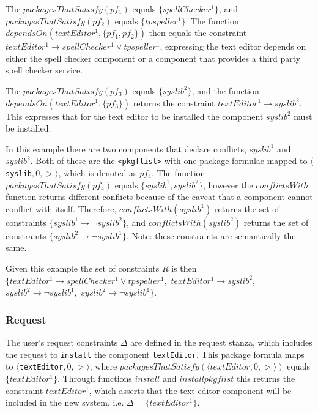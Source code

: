 The $packagesThatSatisfy(pf_1)$ equals $\{spellChecker^1\}$, and $packagesThatSatisfy(pf_2)$ equals $\{tpspeller^1\}$.
The function $dependsOn(textEditor^1 , \{pf_1,pf_2\} )$ 
then equals the constraint $textEditor^1 \rightarrow spellChecker^1 \vee tpspeller^1$,
expressing the text editor depends on either the spell checker component or a component that provides a third party spell checker service.

The $packagesThatSatisfy(pf_3)$ equals $\{syslib^2\}$,
and the function  $dependsOn(textEditor^1 , \{pf_3\} )$ returns the constraint  $textEditor^1 \rightarrow syslib^2$.
This expresses that for the text editor to be installed the component $syslib^2$ must be installed.

In this example there are two components that declare conflicts, $syslib^1$ and $syslib^2$.
Both of these are the \verb+<pkgflist>+ with one package formulae mapped to  $\langle $\verb+syslib+$,0,>\rangle$, which is denoted as $pf_4$.
The function $packagesThatSatisfy(pf_4)$ equals $\{ syslib^1,syslib^2 \}$,
however the $conflictsWith$ function returns different conflicts because of the caveat that a component cannot conflict with itself.
Therefore, $conflictsWith(syslib^1)$ returns the set of constraints $\{syslib^1 \rightarrow \neg syslib^2\}$,
and $conflictsWith(syslib^2)$ returns the set of constraints $\{syslib^2 \rightarrow \neg syslib^1\}$.
Note: these constraints are semantically the same.

Given this example the set of constraints $R$ is then 
$\{ textEditor^1 \rightarrow spellChecker^1 \vee tpspeller^1,$ 
$textEditor^1 \rightarrow syslib^2,$ 
$syslib^2 \rightarrow \neg syslib^1,$   
$syslib^2 \rightarrow \neg syslib^1\}$.

\subsubsection{Request}
The user's request constraints $\Delta$ are defined in the request stanza, which includes the request to \verb+install+ the component \verb+textEditor+. 
This package formula maps to $\langle $\verb+textEditor+$,0,>\rangle$, where $packagesThatSatisfy(\langle textEditor,0,>\rangle)$ equals $\{textEditor^1\}$.
Through functions $install$ and $installpkgflist$ this returns the constraint $textEditor^1$,
which asserts that the text editor component will be included in the new system, i.e. $\Delta = \{textEditor^1\}$.

